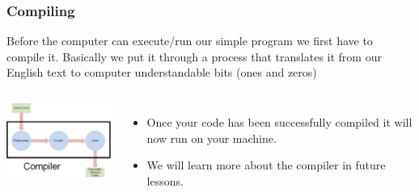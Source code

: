 \documentclass{if-beamer}
\begin{document}
\begin{frame}
\frametitle{Compiling}
Before the computer can execute/run our simple program we first have to compile it. Basically we put it through a process that translates it from our English text to computer understandable bits (ones and zeros) \\
\medskip
\begin{columns}[c] %

\includegraphics[width = 2in]{figures/compiler}

\begin{itemize}
\item Once your code has been successfully compiled it will now run on your machine.
\item We will learn more about the compiler in future lessons. 
\end{itemize}

\end{columns}

\end{frame}
\end{document}
